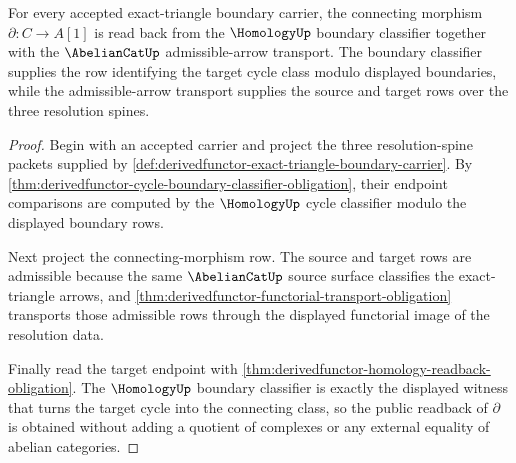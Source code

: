 \begin{theorem}\label{thm:derivedfunctor-connecting-morphism-readback}
For every accepted exact-triangle boundary carrier, the connecting morphism $\partial:C\to A[1]$ is read back from the $\HomologyUp$ boundary classifier together with the $\AbelianCatUp$ admissible-arrow transport. The boundary classifier supplies the row identifying the target cycle class modulo displayed boundaries, while the admissible-arrow transport supplies the source and target rows over the three resolution spines.
\end{theorem}
\begin{proof}
Begin with an accepted carrier and project the three resolution-spine packets supplied by \autoref{def:derivedfunctor-exact-triangle-boundary-carrier}. By \autoref{thm:derivedfunctor-cycle-boundary-classifier-obligation}, their endpoint comparisons are computed by the $\HomologyUp$ cycle classifier modulo the displayed boundary rows.

Next project the connecting-morphism row. The source and target rows are admissible because the same $\AbelianCatUp$ source surface classifies the exact-triangle arrows, and \autoref{thm:derivedfunctor-functorial-transport-obligation} transports those admissible rows through the displayed functorial image of the resolution data.

Finally read the target endpoint with \autoref{thm:derivedfunctor-homology-readback-obligation}. The $\HomologyUp$ boundary classifier is exactly the displayed witness that turns the target cycle into the connecting class, so the public readback of $\partial$ is obtained without adding a quotient of complexes or any external equality of abelian categories.
\end{proof}

